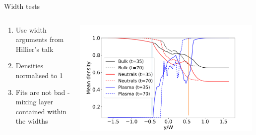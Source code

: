 \documentclass[10pt,aspectratio=169,usenames,dvipsnames]{beamer}
\begin{document}
\begin{frame}{Width tests}
\begin{columns}
\begin{column}{0.5\textwidth}
\begin{enumerate}
\item Use width arguments from Hillier's talk
\item Densities normalised to 1
\item Fits are not bad - mixing layer contained within the widths
\end{enumerate}
\end{column}
\begin{column}{0.5\textwidth}
\includegraphics[width=0.99\textwidth]{2023Mixing/Figures/KHInlev_widthtest.png}
\end{column}
\end{columns}
\end{frame}

\end{document}
